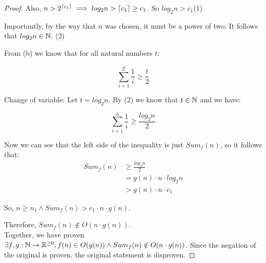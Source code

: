 \documentclass[12pt, a4paper]{amsart}
\theoremstyle{definition}
\theoremstyle{remark}
\numberwithin{Theorem}{section}
\begin{document}
\begin{enumerate}
\begin{proof}
    Also, $n > 2^{\left \lceil c_1 \right \rceil}  \implies log_2 n > \left \lceil c_1 \right \rceil \geq c_1$. So $log_2 n > c_1 $(1)
    
    Importantly, by the way that $n$ was chosen, it must be a power of two.
    It follows that $log_2 n \in \mathbb N$. (2)
    
    
    From (b) we know that for all natural numbers $t$:
    
    $$\sum_{i = 1}^{2^t} \frac{1}{i} \geq \frac{t}{2}$$
    
    Change of variable: Let $t = log_2 n$. By (2) we know that $t \in \mathbb N$ and we have:
    
    $$\sum_{i = 1}^{n} \frac{1}{i} \geq \frac{log_2 n }{2}$$
    
    Now we can see that the left side of the inequality is just $Sum_f (n)$, so it follows that:
\begin{align*}
    Sum_f (n)  &\geq \frac{log_2 n }{2} \\
    &= g(n)\cdot n \cdot log_2 n \\
    &> g(n) \cdot n \cdot c_1 \tag{(By (1), $log_2 n > c_1$}
\end{align*}

So, $n \geq n_1 \land Sum_f(n) > c_1 \cdot n \cdot g(n)$. 

Therefore, $Sum_f(n) \notin O(n\cdot g(n))$. \\

Together, we have proven $\exists f, g: \mathbb N \xrightarrow{} \mathbb R^{\geq 0}, f(n) \in O(g(n)) \land Sum_f(n) \notin O(n\cdot g(n))$. Since the negation of the original is proven, the original statement is disproven.
\end{proof}
\end{enumerate}
\end{document}
